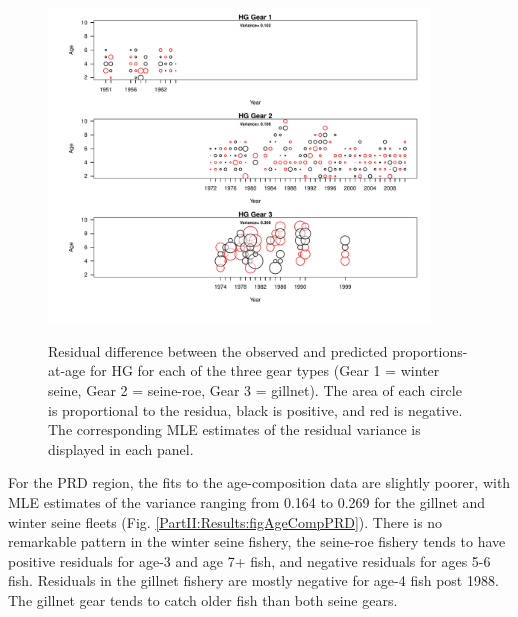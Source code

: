 \begin{figure}
	\centering
	\includegraphics[width=0.9\textwidth]{../FIGS/qPriorFigs/iscam_fig_agecompsresid_HG.pdf}\\
	\caption{Residual difference between the observed and predicted proportions-at-age for HG for each of the three gear types (Gear 1 = winter seine, Gear 2 = seine-roe, Gear 3 = gillnet).  The area of each circle is proportional to the residua, black is positive, and red is negative.  The corresponding MLE estimates of the residual variance is displayed in each panel.}\label{PartII:Results:figAgeCompHG}
\end{figure}

For the PRD region, the fits to the age-composition data are slightly poorer, with MLE estimates of the variance ranging from 0.164 to 0.269 for the gillnet and winter seine fleets (Fig. \ref{PartII:Results:figAgeCompPRD}). There is no remarkable pattern in the winter seine fishery, the seine-roe fishery tends to have positive residuals for age-3 and age 7+ fish, and negative residuals for ages 5-6 fish. Residuals in the gillnet fishery are mostly negative for age-4 fish post 1988. The gillnet gear tends to catch older fish than both seine gears.

